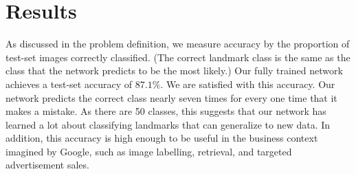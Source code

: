 \section{Results}
As discussed in the problem definition, we measure accuracy by the proportion of test-set images correctly classified. (The correct landmark class is the same as the class that the network predicts to be the most likely.) Our fully trained network achieves a test-set accuracy of $87.1\%$. We are satisfied with this accuracy. Our network predicts the correct class nearly seven times for every one time that it makes a mistake. As there are 50 classes, this suggests that our network has learned a lot about classifying landmarks that can generalize to new data. In addition, this accuracy is high enough to be useful in the business context imagined by Google, such as image labelling, retrieval, and targeted advertisement sales.